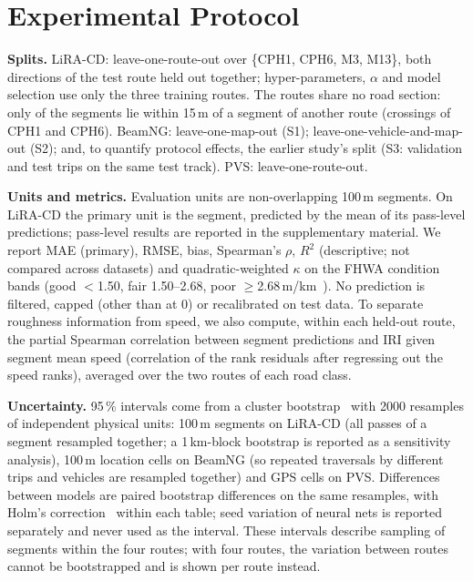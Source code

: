 \section{Experimental Protocol}
\label{sec:protocol}
\textbf{Splits.}
LiRA-CD: leave-one-route-out over \{CPH1, CPH6, M3, M13\}, both directions of the test route held out together; hyper-parameters, $\alpha$ and model selection use only the three training routes.
The routes share no road section: only \overlapWithin{} of the \liraSegments{} segments lie within 15\,m of a segment of another route (crossings of CPH1 and CPH6).
BeamNG: leave-one-map-out (S1); leave-one-vehicle-and-map-out (S2); and, to quantify protocol effects, the earlier study's split (S3: validation and test trips on the same test track).
PVS: leave-one-route-out.

\textbf{Units and metrics.}
Evaluation units are non-overlapping 100\,m segments. On LiRA-CD the primary unit is the segment, predicted by the mean of its pass-level predictions; pass-level results are reported in the supplementary material.
We report MAE (primary), RMSE, bias, Spearman's $\rho$, $R^2$ (descriptive; not compared across datasets) and quadratic-weighted $\kappa$ on the FHWA condition bands (good $<$1.50, fair 1.50--2.68, poor $\geq$2.68\,m/km~\cite{fhwa490}).
No prediction is filtered, capped (other than at 0) or recalibrated on test data.
To separate roughness information from speed, we also compute, within each held-out route, the partial Spearman correlation between segment predictions and IRI given segment mean speed (correlation of the rank residuals after regressing out the speed ranks), averaged over the two routes of each road class.

\textbf{Uncertainty.}
95\,\% intervals come from a cluster bootstrap~\cite{fieldwelsh2007} with 2000 resamples of independent physical units: 100\,m segments on LiRA-CD (all passes of a segment resampled together; a 1\,km-block bootstrap is reported as a sensitivity analysis), 100\,m location cells on BeamNG (so repeated traversals by different trips and vehicles are resampled together) and GPS cells on PVS.
Differences between models are paired bootstrap differences on the same resamples, with Holm's correction~\cite{holm1979} within each table; seed variation of neural nets is reported separately and never used as the interval.
These intervals describe sampling of segments within the four routes; with four routes, the variation between routes cannot be bootstrapped and is shown per route instead.

